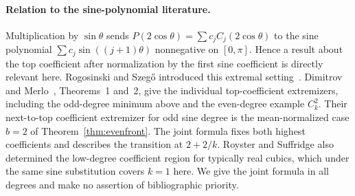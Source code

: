 \paragraph{Relation to the sine-polynomial literature.}
Multiplication by $\sin\theta$ sends $P(2\cos\theta)=\sum c_j C_j(2\cos\theta)$
to the sine polynomial $\sum c_j\sin((j+1)\theta)$ nonnegative on
$[0,\pi]$. Hence a result about the top coefficient after normalization
by the first sine coefficient is directly relevant here. Rogosinski
and Szeg\H{o} introduced this extremal setting~\cite{rs}.
Dimitrov and Merlo~\cite{dm}, Theorems~1 and~2, give the individual
top-coefficient extremizers, including the odd-degree minimum above
and the even-degree example $C_k^2$. Their next-to-top coefficient
extremizer for odd sine degree is the mean-normalized case $b=2$ of
Theorem~\ref{thm:evenfront}. The joint formula fixes both highest
coefficients and describes the transition at $2+2/k$. Royster and Suffridge also determined the low-degree coefficient region for
typically real cubics, which under the same sine substitution covers
$k=1$ here.\cite{roysuff} We give the joint formula in all degrees and
make no assertion of bibliographic priority.
